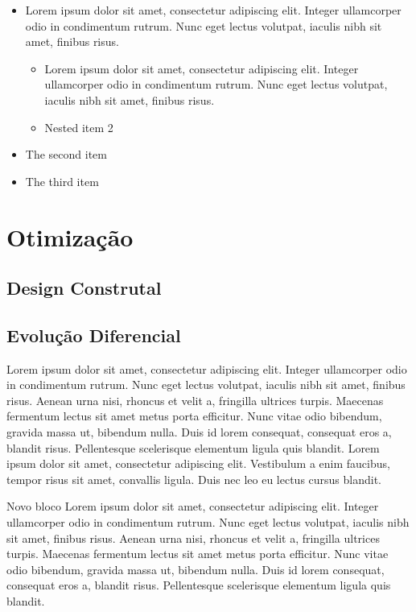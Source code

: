 \documentclass[xcolor=dvipsnames,10pt]{beamer}
\begin{document}
\begin{frame}

\begin{itemize}
\item Lorem ipsum dolor sit amet, consectetur adipiscing elit. Integer ullamcorper odio in condimentum rutrum. Nunc eget lectus volutpat, iaculis nibh sit amet, finibus risus.
\begin{itemize}
\item Lorem ipsum dolor sit amet, consectetur adipiscing elit. Integer ullamcorper odio in condimentum rutrum. Nunc eget lectus volutpat, iaculis nibh sit amet, finibus risus.
\item Nested item 2
\end{itemize}
\item The second item
\item The third item
\end{itemize}

\end{frame}

\section{Otimização}

\subsection{Design Construtal}

\subsection{Evolução Diferencial}
\begin{frame}

Lorem ipsum dolor sit amet, consectetur adipiscing elit. Integer ullamcorper odio in condimentum rutrum. Nunc eget lectus volutpat, iaculis nibh sit amet, finibus risus. Aenean urna nisi, rhoncus et velit a, fringilla ultrices turpis. Maecenas fermentum lectus sit amet metus porta efficitur. Nunc vitae odio bibendum, gravida massa ut, bibendum nulla. Duis id lorem consequat, consequat eros a, blandit risus. Pellentesque scelerisque elementum ligula quis blandit. Lorem ipsum dolor sit amet, consectetur adipiscing elit. Vestibulum a enim faucibus, tempor risus sit amet, convallis ligula. Duis nec leo eu lectus cursus blandit.

\end{frame}

\begin{frame}

\begin{block}{Novo bloco}
Lorem ipsum dolor sit amet, consectetur adipiscing elit. Integer ullamcorper odio in condimentum rutrum. Nunc eget lectus volutpat, iaculis nibh sit amet, finibus risus. Aenean urna nisi, rhoncus et velit a, fringilla ultrices turpis. Maecenas fermentum lectus sit amet metus porta efficitur. Nunc vitae odio bibendum, gravida massa ut, bibendum nulla. Duis id lorem consequat, consequat eros a, blandit risus. Pellentesque scelerisque elementum ligula quis blandit.
\end{block}

\end{frame}
\end{document}
